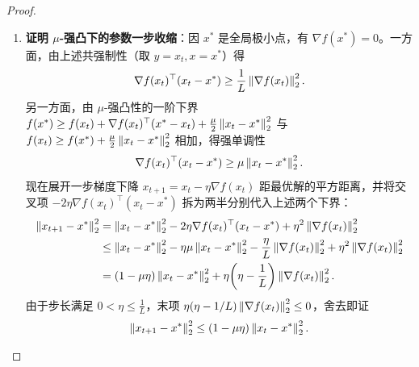 \begin{proof}
\begin{enumerate}[label=(\arabic*), leftmargin=1.8em]
  \item \textbf{证明 $\mu$-强凸下的参数一步收缩}：因 $x^*$ 是全局极小点，有 $\nabla f(x^*) = 0$。一方面，由上述共强制性（取 $y = x_t, x = x^*$）得
  \[
    \nabla f(x_t)^\top(x_t - x^*) \ge \frac{1}{L}\left\|\nabla f(x_t)\right\|_2^2.
  \]
  另一方面，由 $\mu$-强凸性的一阶下界 $f(x^*) \ge f(x_t) + \nabla f(x_t)^\top(x^* - x_t) + \frac{\mu}{2}\left\|x_t - x^*\right\|_2^2$ 与 $f(x_t) \ge f(x^*) + \frac{\mu}{2}\left\|x_t - x^*\right\|_2^2$ 相加，得强单调性
  \[
    \nabla f(x_t)^\top(x_t - x^*) \ge \mu\left\|x_t - x^*\right\|_2^2.
  \]
  现在展开一步梯度下降 $x_{t+1} = x_t - \eta\nabla f(x_t)$ 距最优解的平方距离，并将交叉项 $-2\eta\nabla f(x_t)^\top(x_t - x^*)$ 拆为两半分别代入上述两个下界：
  \begin{align*}
    \left\|x_{t+1} - x^*\right\|_2^2
    &= \left\|x_t - x^*\right\|_2^2 - 2\eta\nabla f(x_t)^\top(x_t - x^*) + \eta^2\left\|\nabla f(x_t)\right\|_2^2 \\
    &\le \left\|x_t - x^*\right\|_2^2 - \eta\mu\left\|x_t - x^*\right\|_2^2 - \frac{\eta}{L}\left\|\nabla f(x_t)\right\|_2^2 + \eta^2\left\|\nabla f(x_t)\right\|_2^2 \\
    &= (1 - \mu\eta)\left\|x_t - x^*\right\|_2^2 + \eta\!\left(\eta - \frac{1}{L}\right)\left\|\nabla f(x_t)\right\|_2^2.
  \end{align*}
  由于步长满足 $0 < \eta \le \frac{1}{L}$，末项 $\eta(\eta - 1/L)\left\|\nabla f(x_t)\right\|_2^2 \le 0$，舍去即证
  \[
    \left\|x_{t+1} - x^*\right\|_2^2 \le (1 - \mu\eta)\left\|x_t - x^*\right\|_2^2. \qedhere
  \]
\end{enumerate}
\end{proof}

